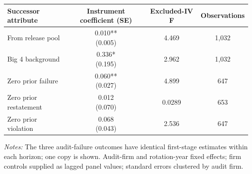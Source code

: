 \documentclass[10pt]{article}
\begin{document}
\begin{minipage}{19cm}\fontsize{10}{12}\selectfont\setlength{\tabcolsep}{4pt}\renewcommand{\arraystretch}{1.12}


\centering
{}
\begin{threeparttable}
\begin{tabular}{p{}ccc}
\toprule
Successor attribute & Instrument coefficient (SE) & Excluded-IV F & Observations \\
\midrule
From release pool & \shortstack{0.010**\\(0.005)} & 4.469 & 1,032 \\
Big 4 background & \shortstack{0.336*\\(0.195)} & 2.962 & 1,032 \\
Zero prior failure & \shortstack{0.060**\\(0.027)} & 4.899 & 647 \\
Zero prior restatement & \shortstack{0.012\\(0.070)} & 0.0289 & 653 \\
Zero prior violation & \shortstack{0.068\\(0.043)} & 2.536 & 647 \\
\bottomrule
\end{tabular}
\begin{tablenotes}\fontsize{9}{11}\selectfont
\item \raggedright \fontsize{9}{11}\selectfont \textit{Notes:} The three audit-failure outcomes have identical first-stage estimates within each horizon; one copy is shown. Audit-firm and rotation-year fixed effects; firm controls supplied as lagged panel values; standard errors clustered by audit firm.
\end{tablenotes}
\end{threeparttable}

\end{minipage}
\end{document}
